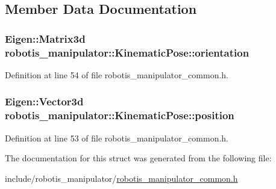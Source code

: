 \subsection{Member Data Documentation}
\subsubsection[{\texorpdfstring{orientation}{orientation}}]{\setlength{\rightskip}{0pt plus 5cm}Eigen\+::\+Matrix3d robotis\+\_\+manipulator\+::\+Kinematic\+Pose\+::orientation}\hypertarget{structrobotis__manipulator_1_1_kinematic_pose_a0506da3cc344d21656fdd1befdd7fa27}{}\label{structrobotis__manipulator_1_1_kinematic_pose_a0506da3cc344d21656fdd1befdd7fa27}


Definition at line 54 of file robotis\+\_\+manipulator\+\_\+common.\+h.

\subsubsection[{\texorpdfstring{position}{position}}]{\setlength{\rightskip}{0pt plus 5cm}Eigen\+::\+Vector3d robotis\+\_\+manipulator\+::\+Kinematic\+Pose\+::position}\hypertarget{structrobotis__manipulator_1_1_kinematic_pose_a8700e7ae2388242cf540e884d52fd97a}{}\label{structrobotis__manipulator_1_1_kinematic_pose_a8700e7ae2388242cf540e884d52fd97a}


Definition at line 53 of file robotis\+\_\+manipulator\+\_\+common.\+h.



The documentation for this struct was generated from the following file\+:\begin{DoxyCompactItemize}
\item 
include/robotis\+\_\+manipulator/\hyperlink{robotis__manipulator__common_8h}{robotis\+\_\+manipulator\+\_\+common.\+h}\end{DoxyCompactItemize}
